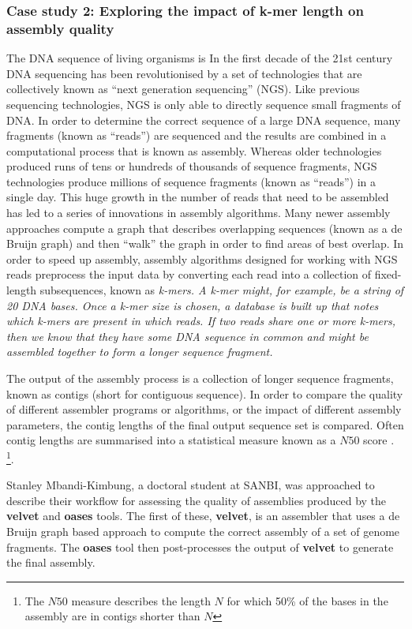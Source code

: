 \documentclass[a4paper,10pt]{scrreprt} \usepackage[utf8]{inputenc}
\begin{document}
\subsubsection{Case study 2: Exploring the impact of k-mer length on assembly quality}

The DNA sequence of living organisms is In the first decade of the 21st century
DNA sequencing has been revolutionised by a set of technologies that are
collectively known as ``next generation sequencing''
(NGS)\cite{shendure_next-generation_2008}. Like previous sequencing
technologies, NGS is only able to directly sequence small fragments of
\gls{DNA}. In order to determine the correct sequence of a large \gls{DNA}
sequence, many fragments (known as ``reads'') are sequenced and the results are
combined in a computational process that is known as assembly. Whereas older
technologies produced runs of tens or hundreds of thousands of sequence
fragments, NGS technologies produce millions of sequence fragments (known as
``reads'') in a single day. This huge growth in the number of reads that need to
be assembled has led to a series of innovations in assembly algorithms.
Many newer assembly approaches compute a graph that describes overlapping
sequences (known as a de Bruijn graph) and then ``walk'' the graph in order to
find areas of best overlap. \cite{compeau_how_2011} In order to speed up
assembly, assembly algorithms designed for working with NGS reads preprocess the
input data by converting each read into a collection of fixed-length
subsequences, known as \em{k-mers}. A k-mer might, for example, be a string of
20 \gls{DNA} bases. Once a k-mer size is chosen, a database is built up that
notes which k-mers are present in which reads. If two reads share one or more
k-mers, then we know that they have some \gls{DNA} sequence in common and might
be assembled together to form a longer sequence fragment.

The output of the assembly process is a collection of longer sequence fragments,
known as contigs (short for contiguous sequence). In order to compare the
quality of different assembler programs or algorithms, or the impact of
different assembly parameters, the contig lengths of the final output sequence
set is compared. Often contig lengths are summarised into a statistical measure
known as a $N50$ score \cite{burton_n50_2008}. \footnote{The $N50$ measure
describes the length $N$ for which 50\% of the bases in the assembly are in
contigs shorter than $N$}.

Stanley Mbandi-Kimbung, a doctoral student at SANBI, was approached to describe
their workflow for assessing the quality of assemblies produced by the
\textbf{velvet} \cite{zerbino_velvet:_2008} and \textbf{oases}
\cite{schulz_oases:_2012} tools. The first of these, \textbf{velvet}, is an
assembler that uses a de Bruijn graph based approach to compute the correct
assembly of a set of genome fragments. The \textbf{oases} tool then
post-processes the output of \textbf{velvet} to generate the final
assembly. 
\end{document}
